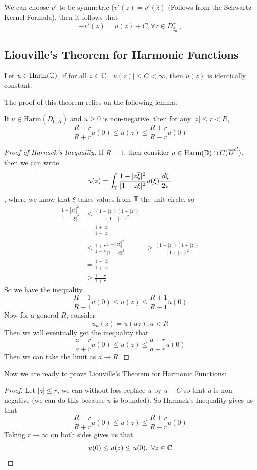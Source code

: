 We can choose $v'$ to be symmetric ($v'(z) = v'(\overline{z})$ (Follows from the Schwartz Kernel Formula), then it follows that
\[-v'(z) = u(z) + C, \forall z \in D_{\xi_0, r}^+\]

\subsection{Liouville's Theorem for Harmonic Functions}

\begin{theorem}
    Let $u \in \text{Harm}(\mathbb{C})$, if for all $z \in \mathbb{C}$, $|u(z)| \leq C < \infty$, then $u(z)$ is identically constant.
\end{theorem}

The proof of this theorem relies on the following lemma:

\begin{theorem}
    If $u \in \text{Harm}(D_{0, R})$ and $u \geq 0$ is non-negative, then for any $|z| \leq r < R$,
    \[\frac{R - r}{R + r} u(0) \leq u(z) \leq \frac{R + r}{R - r} u(0)\]
\end{theorem}

\begin{proof}[Proof of Harnack's Inequality]
    If $R = 1$, then consider $u \in \text{Harm}(\mathbb{D}) \cap C(\overline{D}^{cl})$, then we can write
    \[u(z) = \int_{\mathbb{T}} \frac{1 - |z \overline{\xi}|^2}{|1 - z \xi|^2} u(\xi) \frac{|d\xi|}{2\pi}\]
    , where we know that $\xi$ takes values from $\mathbb{T}$ the unit circle, so
    \begin{align*}
        \frac{1 - |z \overline{\xi}|^2}{|1 - z \xi|^2} &\leq \frac{(1 - |z|)(1 + |z|)}{(1 - |z|)^2}\\
        &= \frac{1 + |z|}{1 - |z|}\\
        &\leq \frac{1 + r}{1 - r} \tag*{Since $|z|$ is monotonic}
        \frac{1 - |z \overline{\xi}|^2}{|1 - z \xi|^2} &\geq \frac{(1 - |z|)(1 + |z|)}{(1 + |z|)^2}\\
        &= \frac{1 - |z|}{1 + |z|}\\
        &\geq \frac{1 - r}{1 + r} \tag*{Since $|z|$ is monotonic}
    \end{align*}
    So we have the inequality
    \[\frac{R - 1}{R + 1} u(0) \leq u(z) \leq \frac{R + 1}{R - 1} u(0)\]
    Now for a general $R$, consider
    \[u_a(z) = u(az), a < R\]
    Then we will eventually get the inequality that
    \[\frac{a - r}{a + r} u(0) \leq u(z) \leq \frac{a + r}{a - r} u(0)\]
    Then we can take the limit as $a \to R$.
\end{proof}

Now we are ready to prove Liouville's Theorem for Harmonic Functions:

\begin{proof}
    Let $|z| \leq r$, we can without loss replace $u$ by $u + C$ so that $u$ is non-negative (we can do this because $u$ is bounded). So Harnack's Inequality gives us that
    \[\frac{R - r}{R + r} u(0) \leq u(z) \leq \frac{R + r}{R - r} u(0)\]
    Taking $r \to \infty$ on both sides gives us that
    \[u(0) \leq u(z) \leq u(0),\ \forall z \in \mathbb{C}\]
\end{proof}